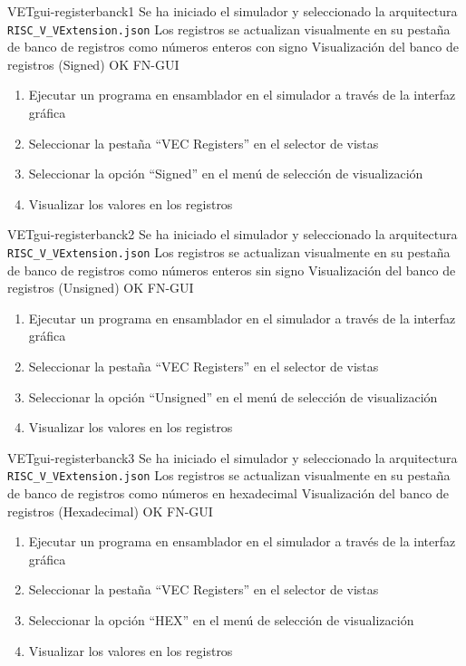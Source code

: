 \begin{testCase}{VET}{gui-registerbanck1}
    {Se ha iniciado el simulador y seleccionado la arquitectura \texttt{RISC\_V\_VExtension.json}}
    {Los registros se actualizan visualmente en su pestaña de banco de registros como números enteros con signo}
    {Visualización del banco de registros (Signed)} %
    {OK} %
    {FN-GUI} %
    \begin{enumerate}
        \item Ejecutar un programa en ensamblador en el simulador a través de la interfaz gráfica
        \item Seleccionar la pestaña ``VEC Registers'' en el selector de vistas
        \item Seleccionar la opción ``Signed'' en el menú de selección de visualización
        \item Visualizar los valores en los registros
    \end{enumerate}
\end{testCase}

\begin{testCase}{VET}{gui-registerbanck2}
    {Se ha iniciado el simulador y seleccionado la arquitectura \texttt{RISC\_V\_VExtension.json}}
    {Los registros se actualizan visualmente en su pestaña de banco de registros como números enteros sin signo}
    {Visualización del banco de registros (Unsigned)} %
    {OK} %
    {FN-GUI}
    \begin{enumerate}
        \item Ejecutar un programa en ensamblador en el simulador a través de la interfaz gráfica
        \item Seleccionar la pestaña ``VEC Registers'' en el selector de vistas
        \item Seleccionar la opción ``Unsigned'' en el menú de selección de visualización
        \item Visualizar los valores en los registros
    \end{enumerate}
\end{testCase}

\begin{testCase}{VET}{gui-registerbanck3}
    {Se ha iniciado el simulador y seleccionado la arquitectura \texttt{RISC\_V\_VExtension.json}}
    {Los registros se actualizan visualmente en su pestaña de banco de registros como números en hexadecimal}
    {Visualización del banco de registros (Hexadecimal)} %
    {OK} %
    {FN-GUI}
    \begin{enumerate}
        \item Ejecutar un programa en ensamblador en el simulador a través de la interfaz gráfica
        \item Seleccionar la pestaña ``VEC Registers'' en el selector de vistas
        \item Seleccionar la opción ``HEX'' en el menú de selección de visualización
        \item Visualizar los valores en los registros
    \end{enumerate}
\end{testCase}


